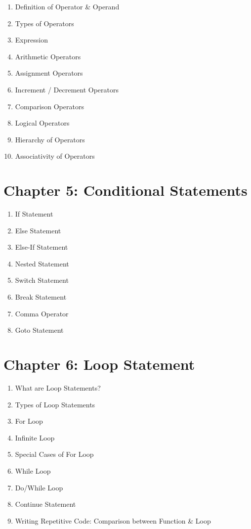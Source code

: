 \documentclass[a4paper,11pt]{article}
\begin{document}
	\begin{enumerate}
		\item Definition of Operator \& Operand
		\item Types of Operators
		\item Expression
		\item Arithmetic Operators
		\item Assignment Operators
		\item Increment / Decrement Operators
		\item Comparison Operators
		\item Logical Operators
		\item Hierarchy of Operators
		\item Associativity of Operators
	\end{enumerate}


	\section*{ Chapter 5: Conditional Statements }

	\begin{enumerate}
		\item If Statement
		\item Else Statement
		\item Else-If Statement
		\item Nested Statement
		\item Switch Statement
		\item Break Statement
		\item Comma Operator
		\item Goto Statement
	\end{enumerate}


	\section*{ Chapter 6: Loop Statement }

	\begin{enumerate}
		\item What are Loop Statements?
		\item Types of Loop Statements
		\item For Loop
		\item Infinite Loop
		\item Special Cases of For Loop
		\item While Loop
		\item Do/While Loop
		\item Continue Statement
		\item Writing Repetitive Code: Comparison between Function \& Loop
	\end{enumerate}
\end{document}
